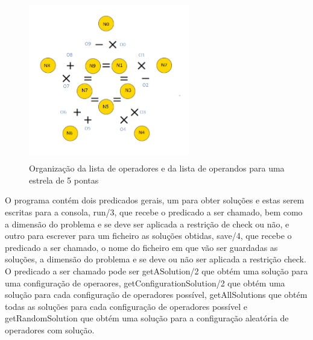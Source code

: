 \begin{figure}[!htb]
\hfill\includegraphics[width=7cm,height=7cm]{images/star_configuration.png}\hspace*{\fill}
\caption{Organização da lista de operadores e da lista de operandos para uma estrela de 5 pontas} \label{fig: organizacao_estrela}
\end{figure}

O programa contém dois predicados gerais, um para obter soluções e estas serem escritas para a consola, run/3, que recebe o predicado a ser chamado, bem como a dimensão do problema e se deve ser aplicada a restrição de check ou não, e outro para escrever para um ficheiro as soluções obtidas, save/4, que recebe o predicado a ser chamado, o nome do ficheiro em que vão ser guardadas as soluções, a dimensão do problema e se deve ou não ser aplicada a restrição check.
O predicado a ser chamado pode ser getASolution/2 que obtém uma solução para uma configuração de operaores, getConfigurationSolution/2 que obtém uma solução para cada configuração de operadores possível, getAllSolutions que obtém todas as soluções para cada configuração de operadores possível e getRandomSolution que obtém uma solução para a configuração aleatória de operadores com solução.
